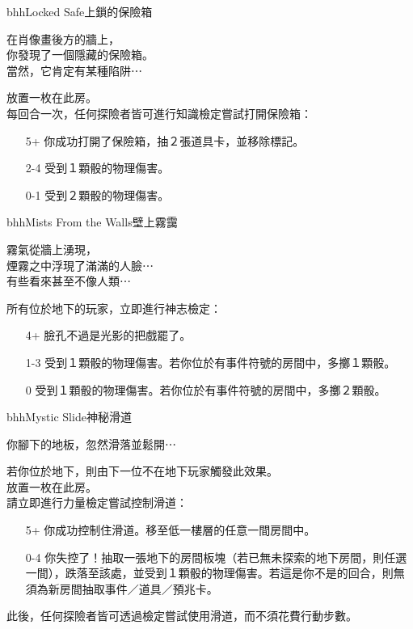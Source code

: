 \begin{EventCard}{bhh}{Locked Safe}{上鎖的保險箱}
  \begin{CardStory}
    在肖像畫後方的牆上，\\
    你發現了一個隱藏的保險箱。\\
    當然，它肯定有某種陷阱⋯
  \end{CardStory}
  放置一枚在此房。\\[0.5em]
  每回合一次，任何探險者皆可進行知識檢定嘗試打開保險箱：
  \begin{itemize}
    \item[5+] 你成功打開了保險箱，抽２張道具卡，並移除標記。
    \item[2-4] 受到１顆骰的物理傷害。
    \item[0-1] 受到２顆骰的物理傷害。
  \end{itemize}
\end{EventCard}%
\linebreak[0]%
\begin{EventCard}{bhh}{Mists From the Walls}{壁上霧靄}
  \begin{CardStory}
    霧氣從牆上湧現，\\
    煙霧之中浮現了滿滿的人臉⋯\\
    有些看來甚至不像人類⋯
  \end{CardStory}
  所有位於地下的玩家，立即進行神志檢定：
  \begin{itemize}
    \item[4+] 臉孔不過是光影的把戲罷了。
    \item[1-3] 受到１顆骰的物理傷害。若你位於有事件符號的房間中，多擲１顆骰。
    \item[0] 受到１顆骰的物理傷害。若你位於有事件符號的房間中，多擲２顆骰。
  \end{itemize}
\end{EventCard}%
\linebreak[0]%
\begin{EventCard}{bhh}{Mystic Slide}{神秘滑道}
  \begin{CardStory}
    你腳下的地板，忽然滑落並鬆開⋯
  \end{CardStory}
  若你位於地下，則由下一位不在地下玩家觸發此效果。\\[0.5em]
  放置一枚在此房。\\[0.5em]
  請立即進行力量檢定嘗試控制滑道：
  \begin{itemize}
    \item[5+] 你成功控制住滑道。移至低一樓層的任意一間房間中。
    \item[0-4] 你失控了！抽取一張地下的房間板塊（若已無未探索的地下房間，則任選一間），跌落至該處，並受到１顆骰的物理傷害。若這是你不是的回合，則無須為新房間抽取事件／道具／預兆卡。
  \end{itemize}
  此後，任何探險者皆可透過檢定嘗試使用滑道，而不須花費行動步數。\\[0.5em]
\end{EventCard}%
